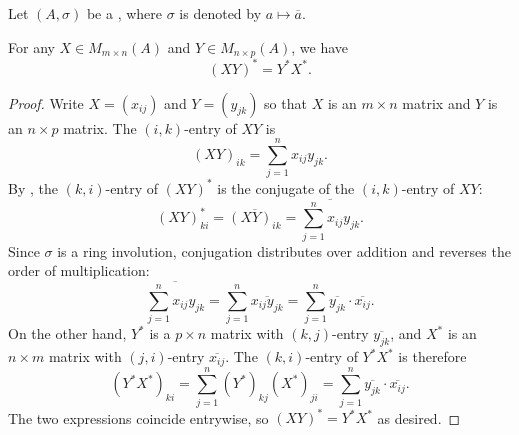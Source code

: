 \begin{lemma} \label{lemma:conjugate_transpose_of_product_of_matrices_over_ring_with_involution_is_anti_product_of_conjugate_transposes}
    Let $(A,\sigma)$ be a , where $\sigma$ is denoted by $a \mapsto \overline{a}$.

    For any $X \in M_{m \times n}(A)$ and $Y \in M_{n \times p}(A)$, we have
    $$(XY)^* = Y^* X^*.$$
\end{lemma}

\begin{proof}
    Write $X = (x_{ij})$ and $Y = (y_{jk})$ so that $X$ is an $m \times n$ matrix and $Y$ is an $n \times p$ matrix. The $(i,k)$-entry of $XY$ is
    $$(XY)_{ik} = \sum_{j=1}^n x_{ij} y_{jk}.$$
    By , the $(k,i)$-entry of $(XY)^*$ is the conjugate of the $(i,k)$-entry of $XY$:
    $$(XY)^*_{ki} = \overline{(XY)_{ik}} = \overline{\sum_{j=1}^n x_{ij} y_{jk}}.$$
    Since $\sigma$ is a ring involution, conjugation distributes over addition and reverses the order of multiplication:
    $$\overline{\sum_{j=1}^n x_{ij} y_{jk}} = \sum_{j=1}^n \overline{x_{ij} y_{jk}} = \sum_{j=1}^n \overline{y_{jk}} \cdot \overline{x_{ij}}.$$
    On the other hand, $Y^*$ is a $p \times n$ matrix with $(k,j)$-entry $\overline{y_{jk}}$, and $X^*$ is an $n \times m$ matrix with $(j,i)$-entry $\overline{x_{ij}}$. The $(k,i)$-entry of $Y^* X^*$ is therefore
    $$(Y^* X^*)_{ki} = \sum_{j=1}^n (Y^*)_{kj} (X^*)_{ji} = \sum_{j=1}^n \overline{y_{jk}} \cdot \overline{x_{ij}}.$$
    The two expressions coincide entrywise, so $(XY)^* = Y^* X^*$ as desired.
\end{proof}